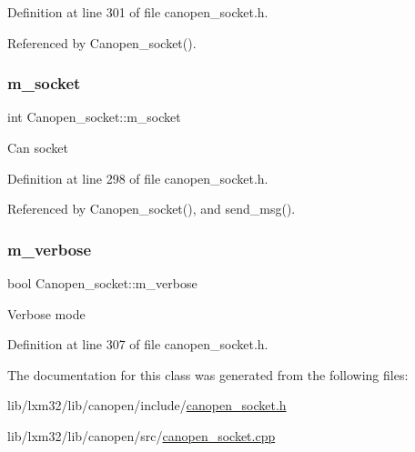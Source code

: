 Definition at line 301 of file canopen\+\_\+socket.\+h.



Referenced by Canopen\+\_\+socket().

\mbox{\label{class_canopen__socket_acc89d9cb40b8b999b0f376a0c7206394}} 
\subsubsection{\texorpdfstring{m\+\_\+socket}{m\_socket}}
{\footnotesize\ttfamily int Canopen\+\_\+socket\+::m\+\_\+socket\hspace{0.3cm}{\ttfamily [private]}}

Can socket 

Definition at line 298 of file canopen\+\_\+socket.\+h.



Referenced by Canopen\+\_\+socket(), and send\+\_\+msg().

\mbox{\label{class_canopen__socket_acac0d3984deafb27f4d6a2f96005c6b9}} 
\subsubsection{\texorpdfstring{m\+\_\+verbose}{m\_verbose}}
{\footnotesize\ttfamily bool Canopen\+\_\+socket\+::m\+\_\+verbose\hspace{0.3cm}{\ttfamily [private]}}

Verbose mode 

Definition at line 307 of file canopen\+\_\+socket.\+h.



The documentation for this class was generated from the following files\+:\begin{DoxyCompactItemize}
\item 
lib/lxm32/lib/canopen/include/\hyperlink{canopen__socket_8h}{canopen\+\_\+socket.\+h}\item 
lib/lxm32/lib/canopen/src/\hyperlink{canopen__socket_8cpp}{canopen\+\_\+socket.\+cpp}\end{DoxyCompactItemize}
